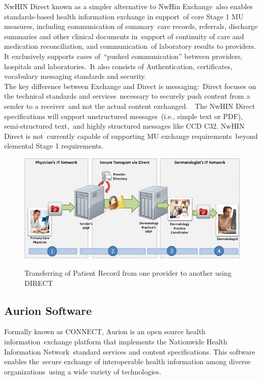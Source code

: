  	NwHIN Direct known as a simpler alternative to NwHin Exchange\
also enables standards-based health information exchange in support\
 of core Stage 1 MU measures, including communication of summary\
care records, referrals, discharge summaries and other clinical documents in\
 support of continuity of care and medication reconciliation, and communication\
 of laboratory results to providers. It exclusively supports cases of\
 “pushed communication” between providers, hospitals and laboratories.\
 It also consists of Authentication, certificates, vocabulary messaging standards and security.\\

\noindent The key difference between Exchange and Direct is messaging:\
Direct focuses on the technical standards and services\
necessary to securely push content from a sender to a receiver\
 and not the actual content exchanged.\
\citep{_nwhin_direct_2013}\ 
The NwHIN Direct specifications will support unstructured messages\ 
(i.e., simple text or PDF), semi-structured text,\
 and highly structured messages  like CCD C32. NwHIN Direct is not\
currently capable of supporting MU exchange requirements\
beyond elemental Stage 1 requirements.\
\citep{_nwhin_exchange_2013}\

 \begin{figure}[ht!]
    \centering
    \includegraphics[scale=0.5]{nwhin.png}
    \caption{Transferring of Patient Record from one provider to another using DIRECT}
    \cite[Fig.~1]{_nwhin_frameworkOne_2013}
    \label{fig:nwhin}
  \end{figure}  

  \subsection{Aurion Software}

	Formally known as CONNECT, Aurion is an open source health information\
exchange platform that implements the Nationwide Health Information Network\
 standard services and content specifications. This software enables the\
secure exchange of interoperable health information among diverse organizations\
 using a wide variety of technologies.\\

